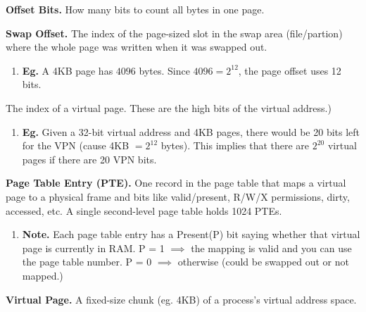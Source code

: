 \documentclass[12pt]{article}
\begin{document}
    \noindent
    {\bf Offset Bits.} {How many bits to count all bytes in one page.} \par  

    {\bf Swap Offset.} {The index of the page-sized slot in the swap area (file/partion) where the whole page was written when it was swapped out.} \par

    \begin{enumerate}
        \item[]{\bf Eg.} {A 4KB page has $4096$ bytes. Since $4096 = 2^{12}$, the page offset uses 12 bits.} \par 
    \end{enumerate}
    \vspace{1em}

     {The index of a virtual page. These are the high bits of the virtual address.)} \par

    \begin{enumerate}
        \item[]{\bf Eg.} {Given a 32-bit virtual address and 4KB pages, there would be 20 bits left for the VPN (cause 4KB $= 2^{12}$ bytes). This implies that there are $2^{20}$ virtual pages if there are 20 VPN bits.} \par 
    \end{enumerate}
    \vspace{1em}

    \setlength{\parindent}{0pt} 
    {\bf Page Table Entry (PTE).} {One record in the page table that maps a virtual page to a physical frame and bits like valid/present, R/W/X permissions, dirty, accessed, etc. A single second-level page table holds 1024 PTEs.} \par
    
    \begin{enumerate}
        \item[]{\bf Note.} {Each page table entry has a Present(P) bit saying whether that virtual page is currently in RAM. P = 1 $\implies$ the mapping is valid and you can use the page table number. P = 0 $\implies$ otherwise (could be swapped out or not mapped.)}
    \end{enumerate}

\vspace{1em}
    {\bf Virtual Page.} {A fixed-size chunk (eg. 4KB) of a process's virtual address space.}
    \setlength{\parindent}{15pt} \par
\end{document}
